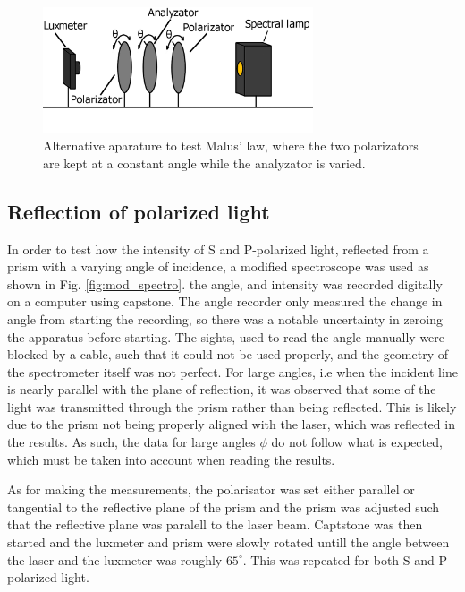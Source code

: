 \documentclass[11pt,a4paper]{article}
\begin{document}
    \begin{figure}[H]
      \center
      \includegraphics[width=8cm]{scripts/figs/diagram_3.png}
      \caption{Alternative aparature to test Malus' law, where the two polarizators are kept at a constant angle while the analyzator is varied.}
      \label{fig:lux_pola_ana_pola_lamp}
    \end{figure}

    \subsection{Reflection of polarized light}
      In order to test how the intensity of S and P-polarized light, reflected from a prism with a varying angle of incidence, a modified spectroscope was used as shown in Fig. \ref{fig:mod_spectro}. the angle, and intensity was recorded digitally on a computer using capstone. The angle recorder only measured the change in angle from starting the recording, so there was a notable uncertainty in zeroing the apparatus before starting. The sights, used to read the angle manually were blocked by a cable, such that it could not be used properly, and the geometry of the spectrometer itself was not perfect. For large angles, i.e when the incident line is nearly parallel with the plane of reflection, it was observed that some of the light was transmitted through the prism rather than being reflected. This is likely due to the prism not being properly aligned with the laser, which was reflected in the results. As such, the data for large angles $\phi$ do not follow what is expected, which must be taken into account when reading the results.

      As for making the measurements, the polarisator was set either parallel or tangential to the reflective plane of the prism and the prism was adjusted such that the reflective plane was paralell to the laser beam. Captstone was then started and the luxmeter and prism were slowly rotated untill the angle between the laser and the luxmeter was roughly $65^\circ$. This was repeated for both S and P-polarized light.
\end{document}
